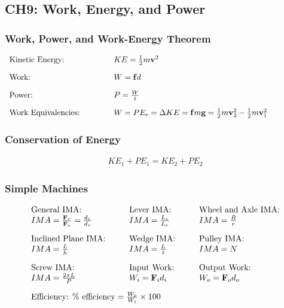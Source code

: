 \documentclass[12pt,a4paper]{article}
\begin{document}
\subsection{CH9: Work, Energy, and Power}

\subsubsection{Work, Power, and Work-Energy Theorem}
\begin{align*}
\begin{array}{l@{\hspace{1.5cm}}l@{\hspace{1.5cm}}l}
\text{Kinetic Energy:} & KE=\frac{1}{2}m\mathbf{v}^2 & \\[1em]
\text{Work:} & W=\mathbf{f}d & \\[1em]
\text{Power:} & P=\frac{W}{t} & \\[1em]
\text{Work Equivalencies:} & W= PE_e=\Delta KE=\mathbf{f}m\mathbf{g}=\frac{1}{2}m\mathbf{v}_2^2-\frac{1}{2}m\mathbf{v}_1^2 &
\end{array}
\end{align*}

\subsubsection{Conservation of Energy}
\begin{align*}
KE_1 + PE_1 = KE_2 + PE_2
\end{align*}

\subsubsection{Simple Machines}
\begin{align*}
\begin{array}{l@{\hspace{1cm}}l@{\hspace{1cm}}l}
\text{General IMA:} & \text{Lever IMA:} & \text{Wheel and Axle IMA:} \\
IMA=\frac{\mathbf{F}_r}{\mathbf{F}_e}=\frac{d_e}{d_r} & IMA=\frac{L_e}{L_r} & IMA=\frac{R}{r} \\[1em]
\text{Inclined Plane IMA:} & \text{Wedge IMA:} & \text{Pulley IMA:} \\
IMA=\frac{L}{h} & IMA=\frac{L}{t} & IMA=N \\[1em]
\text{Screw IMA:} & \text{Input Work:} & \text{Output Work:} \\
IMA=\frac{2\pi L}{P} & W_i=\mathbf{F}_id_i & W_o=\mathbf{F}_od_o \\[1em]
\multicolumn{3}{l}{\text{Efficiency: } \text{\% efficiency}=\frac{W_o}{W_i} \times 100}
\end{array}
\end{align*}
\end{document}
